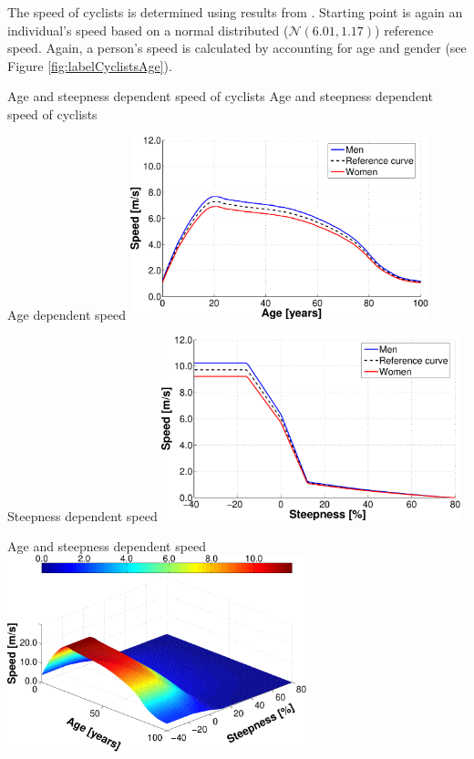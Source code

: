 The speed of cyclists is determined using results from \cite{ParkinRotheram_TPol_2010}. Starting point is again an individual's speed based on a normal distributed ($\mathcal{N}(6.01,1.17)$) reference speed. Again, a person's speed is calculated by accounting for age and gender (see Figure \ref{fig:labelCyclistsAge}).

\createfigure%
{Age and steepness dependent speed of cyclists}%
{Age and steepness dependent speed of cyclists}%
{\label{fig:labelBikeTravelTimes}}%
{%
  \createsubfigure%
  {Age dependent speed}%
  {\includegraphics[width=0.65\textwidth, angle=0]{extending/figures/MultiModalSimulation/cyclistsAge}}%
  {\label{fig:labelCyclistsAge}}%
  {\vspace{5mm}}%

  \createsubfigure%
  {Steepness dependent speed}%
  {\includegraphics[width=0.65\textwidth, angle=0]{extending/figures/MultiModalSimulation/cyclistsSteepness}}%
  {\label{fig:labelCyclistsSteepness}}%
  {\vspace{4mm}}%

  \createsubfigure%
  {Age and steepness dependent speed}%
  {\includegraphics[width=0.65\textwidth, angle=0]{extending/figures/MultiModalSimulation/cyclists3d}}%
  {\label{fig:labelCyclistsAgeSteepness3d}}%
  {}%
}%
{}
\afterpage{\clearpage}	%

